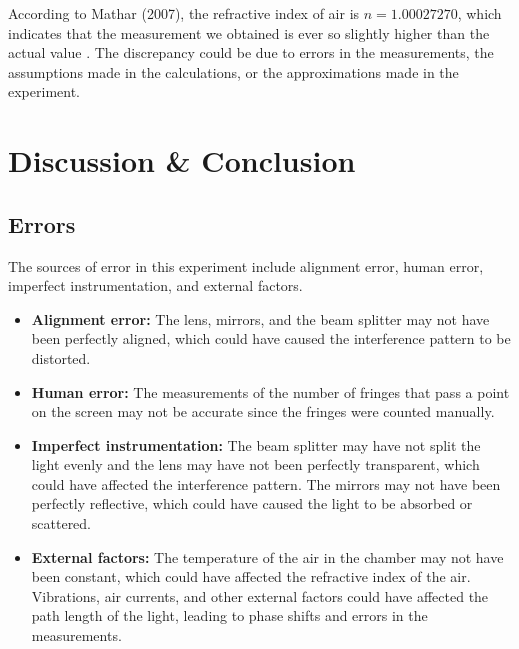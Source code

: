 \documentclass[10pt]{article}
\newcommand{\td}[1]{\todo[linecolor=blue, backgroundcolor=blue!25,bordercolor=blue, size=\small, inline]{#1}}
\begin{document}
According to Mathar (2007), the refractive index of air is $n = 1.00027270$, which indicates that the measurement we obtained is ever so slightly higher than the actual value \cite{Mathar_2007}. The discrepancy could be due to errors in the measurements, the assumptions made in the calculations, or the approximations made in the experiment. 

\td{Question 3.}

\section{Discussion \& Conclusion}

\subsection*{Errors}

The sources of error in this experiment include alignment error, human error, imperfect instrumentation, and external factors.

\begin{itemize}
  \item \textbf{Alignment error:} The lens, mirrors, and the beam splitter may not have been perfectly aligned, which could have caused the interference pattern to be distorted. 
  \item \textbf{Human error:} The measurements of the number of fringes that pass a point on the screen may not be accurate since the fringes were counted manually. 
  \item \textbf{Imperfect instrumentation:} The beam splitter may have not split the light evenly and the lens may have not been perfectly transparent, which could have affected the interference pattern. The mirrors may not have been perfectly reflective, which could have caused the light to be absorbed or scattered.
  \item \textbf{External factors:} The temperature of the air in the chamber may not have been constant, which could have affected the refractive index of the air. Vibrations, air currents, and other external factors could have affected the path length of the light, leading to phase shifts and errors in the measurements. 
\end{itemize}
\end{document}

